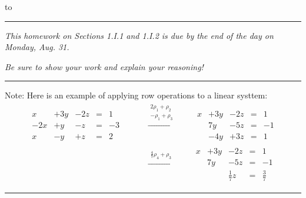 \documentclass[11pt]{article}
\theoremstyle{definition}
\def\rowop#1{\qquad\xrightarrow{\begin{matrix}#1\end{matrix}}\qquad}
\begin{document}
\hbox to 
\nointerlineskip
\vskip 2pt
\hrule height 1pt

\medskip

\centerline{\textit{This homework on Sections 1.I.1 and 1.I.2 is due by the end of the day on Monday, Aug. 31.}}
\centerline{\textit{Be sure to show your work and explain your reasoning!}}

\medskip
\hrule
\medskip

Note: Here is an example of applying row operations to a linear systtem:
\begin{align*}
    \begin{matrix}
       x  &+ 3y &- 2z &= &1\\
     -2x  &+ y  &- z &= &-3\\
       x  &- y  &+ z &= &2 
    \end{matrix}
  & \rowop{2\rho_1 + \rho_2 \\ -\rho_1 +\rho_3}
    \begin{matrix}
       x &+ 3y &- 2z &= &1\\
         &  7y &- 5z &= &-1\\
         &- 4y &+ 3z &= &1 
    \end{matrix}
\\[15pt]
  & \rowop{\frac{4}{7}\rho_4 + \rho_3}
    \begin{matrix}
       x &+ 3y &- 2z &= &1\\
         &  7y &- 5z &= &-1\\
         &     & \frac{1}{7}z &= &\frac{3}{7} 
    \end{matrix}
\end{align*}
 
\hrule
\bigskip
\end{document}
